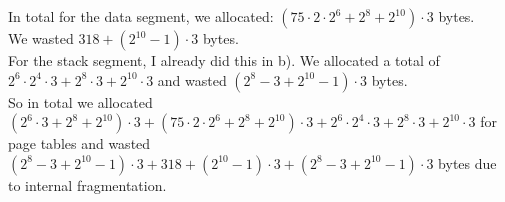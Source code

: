 \documentclass{article}
\begin{document}
\begin{enumerate}[label=\alph*)]
In total for the data segment, we allocated: $(75 \cdot 2 \cdot 2^6 + 2^8 + 2^{10}) \cdot 3$ bytes. \\
We wasted $318 + (2^{10} -1) \cdot 3$ bytes. \\
For the stack segment, I already did this in b). We allocated a total of $2^6 \cdot 2^4 \cdot 3 + 2^8\cdot 3 + 2^{10} \cdot 3$ and wasted $(2^8 - 3 + 2^{10} - 1) \cdot 3$ bytes.  \\
So in total we allocated $(2^6\cdot 3 + 2^8 + 2^{10}) \cdot 3 + (75 \cdot 2 \cdot 2^6 + 2^8 + 2^{10}) \cdot 3 + 2^6 \cdot 2^4 \cdot 3 + 2^8\cdot 3 + 2^{10} \cdot 3$ for page tables and wasted $(2^8 - 3 + 2^{10} - 1) \cdot 3 + 318 + (2^{10} -1) \cdot 3 + (2^8 - 3 + 2^{10} - 1) \cdot3$ bytes due to internal fragmentation. \\
\end{enumerate}
\end{document}
